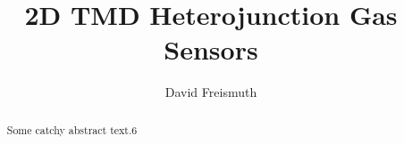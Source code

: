 \documentclass{article}
\begin{document}
\title{2D TMD Heterojunction Gas Sensors}
\author{David Freismuth}

\maketitle

\begin{abstract}
Some catchy abstract text.6
\end{abstract}









\printglossaries
\end{document}
